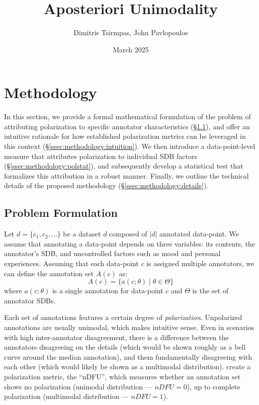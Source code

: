 \documentclass{article}
\title{Aposteriori Unimodality}
\author{Dimitris Tsirmpas, John Pavlopoulos}
\date{March 2025}
\begin{document}
\maketitle

\section{Methodology}

In this section, we provide a formal mathematical formulation of the problem of attributing polarization to specific annotator characteristics (\S\ref{ssec:methodology:problem}), and offer an intuitive rationale for how established polarization metrics can be leveraged in this context (\S\ref{ssec:methodology:intuition}). We then introduce a data-point-level measure that attributes polarization to individual \ac{SDB} factors (\S\ref{ssec:methodology:polstat}), and subsequently develop a statistical test that formalizes this attribution in a robust manner. Finally, we outline the technical details of the proposed methodology (\S\ref{ssec:methodology:details}).

\subsection{Problem Formulation}
\label{ssec:methodology:problem}

Let $d = \{c_1, c_2, \ldots\}$ be a dataset $d$ composed of $\lvert d \rvert$ annotated data-point. We assume that annotating a data-point depends on three variables: its contents, the annotator's \ac{SDB}, and uncontrolled factors such as mood and personal experiences. Assuming that each data-point $c$ is assigned multiple annotators, we can define the annotation set $A(c)$ as:
\begin{equation}
    A(c) = \{a(c; \theta) \mid \theta \in \Theta \}
\end{equation}
\noindent where  $a(c; \theta)$ is a single annotation for data-point $c$ and $\Theta$ is the set of annotator \acp{SDB}.

Each set of annotations features a certain degree of \textit{polarization}. Unpolarized annotations are usually unimodal, which makes intuitive sense. Even in scenarios with high inter-annotator disagreement, there is a difference between the annotators disagreeing on the details (which would be shown roughly as a bell curve around the median annotation), and them fundamentally disagreeing with each other (which would likely be shown as a multimodal distribution). \textcite{pavlopoulos-likas-2024} create a polarization metric, the ``\ac{nDFU}'', which measures whether an annotation set shows no polarization (unimodal distribution --- $nDFU=0$), up to complete polarization (multimodal distribution --- $nDFU=1$). 
\end{document}
